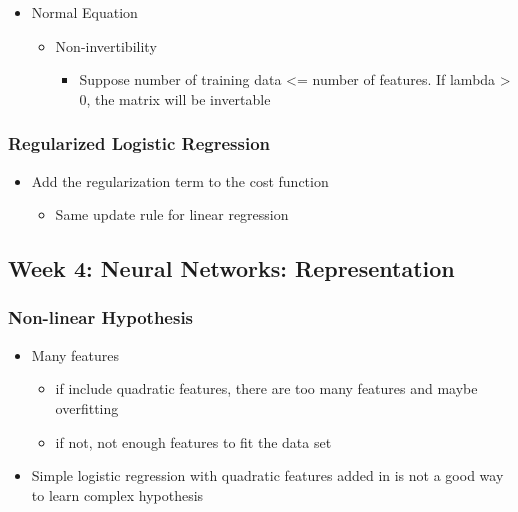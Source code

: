 \documentclass[]{article}
\providecommand{\tightlist}{%
  \setlength{\itemsep}{0pt}\setlength{\parskip}{0pt}}
\begin{document}
\begin{itemize}
\tightlist
\item
  Normal Equation

  \begin{itemize}
  \tightlist
  \item
    Non-invertibility

    \begin{itemize}
    \tightlist
    \item
      Suppose number of training data \textless{}= number of features.
      If lambda \textgreater{} 0, the matrix will be invertable
    \end{itemize}
  \end{itemize}
\end{itemize}

\hypertarget{regularized-logistic-regression}{%
\subsubsection{Regularized Logistic
Regression}\label{regularized-logistic-regression}}

\begin{itemize}
\tightlist
\item
  Add the regularization term to the cost function

  \begin{itemize}
  \tightlist
  \item
    Same update rule for linear regression
  \end{itemize}
\end{itemize}

\hypertarget{week-4-neural-networks-representation}{%
\subsection{Week 4: Neural Networks:
Representation}\label{week-4-neural-networks-representation}}

\hypertarget{non-linear-hypothesis}{%
\subsubsection{Non-linear Hypothesis}\label{non-linear-hypothesis}}

\begin{itemize}
\tightlist
\item
  Many features

  \begin{itemize}
  \tightlist
  \item
    if include quadratic features, there are too many features and maybe
    overfitting
  \item
    if not, not enough features to fit the data set
  \end{itemize}
\item
  Simple logistic regression with quadratic features added in is not a
  good way to learn complex hypothesis
\end{itemize}
\end{document}
